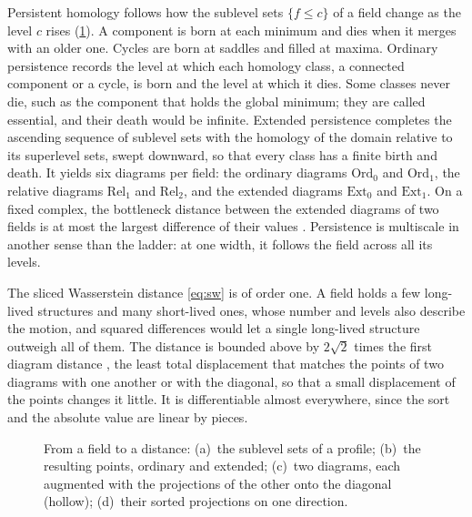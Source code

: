 Persistent homology follows how the sublevel sets $\{f\leq c\}$ of a field change as the level $c$ rises
(\cref{fig:persistence}). A component is born at each minimum and dies when it merges with an older one. Cycles are born
at saddles and filled at maxima. Ordinary persistence \citep{edelsbrunner2002topological,zomorodian2005computing}
records the level at which each homology class, a connected component or a cycle, is born and the level at which it
dies. Some classes never die, such as the component that holds the global minimum; they are called essential, and their
death would be infinite. Extended persistence \citep{cohen2009extending} completes the ascending sequence of sublevel
sets with the homology of the domain relative to its superlevel sets, swept downward, so that every class has a finite
birth and death. It yields six diagrams per field: the ordinary diagrams $\mathrm{Ord}_0$ and $\mathrm{Ord}_1$, the
relative diagrams $\mathrm{Rel}_1$ and $\mathrm{Rel}_2$, and the extended diagrams $\mathrm{Ext}_0$ and
$\mathrm{Ext}_1$. On a fixed complex, the bottleneck distance between the extended diagrams of two fields is at most the
largest difference of their values \citep[Section~6]{cohen2009extending}. Persistence is multiscale in another sense
than the ladder: at one width, it follows the field across all its levels.

The sliced Wasserstein distance \eqref{eq:sw} is of order one. A field holds a few long-lived structures and many
short-lived ones, whose number and levels also describe the motion, and squared differences would let a single
long-lived structure outweigh all of them. The distance is bounded above by $2\sqrt2$ times the first diagram distance
\citep[Theorem~3.3]{carriere2017sliced}, the least total displacement that matches the points of two diagrams with one
another or with the diagonal, so that a small displacement of the points changes it little. It is differentiable
almost everywhere, since the sort and the absolute value are linear by pieces.

\begin{figure}[!htbp]
\centering
{}
\caption{From a field to a distance: (a)~the sublevel sets of a profile; (b)~the resulting points, ordinary and
extended; (c)~two diagrams, each augmented with the projections of the other onto the diagonal (hollow); (d)~their
sorted projections on one direction.}
\label{fig:persistence}
\end{figure}
\FloatBarrier

